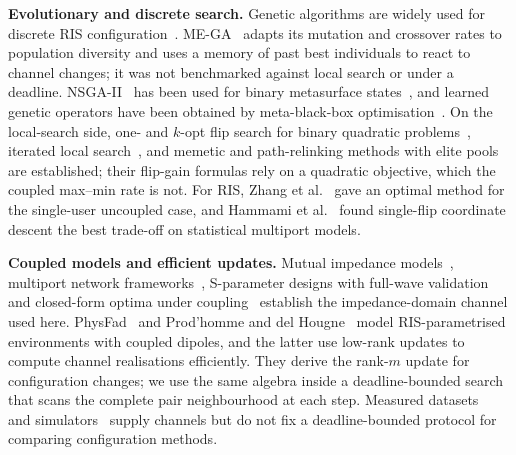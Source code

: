 \documentclass[runningheads]{llncs}
\begin{document}
\textbf{Evolutionary and discrete search.} Genetic algorithms are widely used for discrete RIS configuration~\cite{stylianopoulos2022dlga,radar2024onebitga}. ME-GA~\cite{zardi2024memory} adapts its mutation and crossover rates to population diversity and uses a memory of past best individuals to react to channel changes; it was not benchmarked against local search or under a deadline. NSGA-II~\cite{deb2002fast} has been used for binary metasurface states~\cite{liu2026physics}, and learned genetic operators have been obtained by meta-black-box optimisation~\cite{lange2023discovering}. On the local-search side, one- and $k$-opt flip search for binary quadratic problems~\cite{merz2002bqp}, iterated local search~\cite{lourenco2010ils}, and memetic and path-relinking methods with elite pools~\cite{merz2004memetic,glover2010ddts,lu2010hybrid,wang2012pathrelinking} are established; their flip-gain formulas rely on a quadratic objective, which the coupled max--min rate is not. For RIS, Zhang et al.~\cite{zhang2022configuring} gave an optimal method for the single-user uncoupled case, and Hammami et al.~\cite{hammami2026statistical} found single-flip coordinate descent the best trade-off on statistical multiport models.

\textbf{Coupled models and efficient updates.} Mutual impedance models~\cite{qian2021mutual}, multiport network frameworks~\cite{nerini2024universal,nossek2024physically}, S-parameter designs with full-wave validation~\cite{abrardo2024design} and closed-form optima under coupling~\cite{nerini2026global} establish the impedance-domain channel used here. PhysFad~\cite{faqiri2023physfad} and Prod'homme and del Hougne~\cite{prodhomme2023efficient} model RIS-parametrised environments with coupled dipoles, and the latter use low-rank updates to compute channel realisations efficiently. They derive the rank-$m$ update for configuration changes; we use the same algebra inside a deadline-bounded search that scans the complete pair neighbourhood at each step. Measured datasets~\cite{tewes2023comprehensive,rossanese2024open,piana2026brisc} and simulators~\cite{burtakov2023qris} supply channels but do not fix a deadline-bounded protocol for comparing configuration methods.

\end{document}
